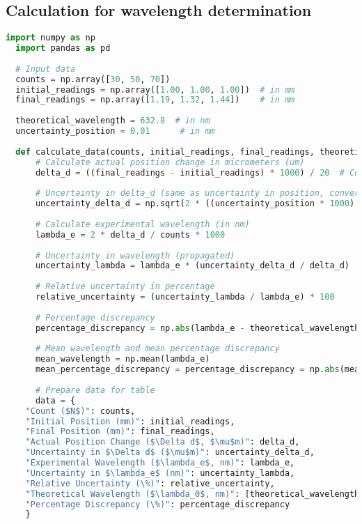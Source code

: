 \documentclass[a4paper,11pt]{article}
\begin{document}
\subsection{Calculation for wavelength determination}
\begin{lstlisting}[language=Python]
  import numpy as np
  import pandas as pd
  
  # Input data
  counts = np.array([30, 50, 70])
  initial_readings = np.array([1.00, 1.00, 1.00])  # in mm
  final_readings = np.array([1.19, 1.32, 1.44])    # in mm
  
  theoretical_wavelength = 632.8  # in nm
  uncertainty_position = 0.01      # in mm
  
  def calculate_data(counts, initial_readings, final_readings, theoretical_wavelength, uncertainty_position):
      # Calculate actual position change in micrometers (um)
      delta_d = ((final_readings - initial_readings) * 1000) / 20  # Convert mm to um and divide by 20
  
      # Uncertainty in delta_d (same as uncertainty in position, converted to um)
      uncertainty_delta_d = np.sqrt(2 * ((uncertainty_position * 1000) / 20)**2)
  
      # Calculate experimental wavelength (in nm)
      lambda_e = 2 * delta_d / counts * 1000
  
      # Uncertainty in wavelength (propagated)
      uncertainty_lambda = lambda_e * (uncertainty_delta_d / delta_d)
  
      # Relative uncertainty in percentage
      relative_uncertainty = (uncertainty_lambda / lambda_e) * 100
  
      # Percentage discrepancy
      percentage_discrepancy = np.abs(lambda_e - theoretical_wavelength) / theoretical_wavelength * 100
  
      # Mean wavelength and mean percentage discrepancy
      mean_wavelength = np.mean(lambda_e)
      mean_percentage_discrepancy = percentage_discrepancy = np.abs(mean_wavelength - theoretical_wavelength) / theoretical_wavelength * 100
  
      # Prepare data for table
      data = {
    "Count ($N$)": counts,
    "Initial Position (mm)": initial_readings,
    "Final Position (mm)": final_readings,
    "Actual Position Change ($\Delta d$, $\mu$m)": delta_d,
    "Uncertainty in $\Delta d$ ($\mu$m)": uncertainty_delta_d,
    "Experimental Wavelength ($\lambda_e$, nm)": lambda_e,
    "Uncertainty in $\lambda_e$ (nm)": uncertainty_lambda,
    "Relative Uncertainty (\%)": relative_uncertainty,
    "Theoretical Wavelength ($\lambda_0$, nm)": [theoretical_wavelength] * len(counts),
    "Percentage Discrepancy (\%)": percentage_discrepancy
    }


\end{lstlisting}
\end{document}
